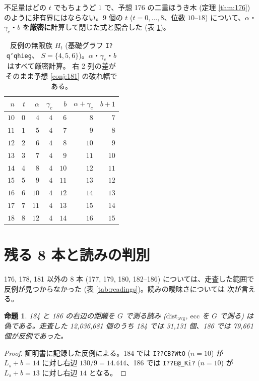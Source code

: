 \documentclass[paper=a4,fontsize=10.5pt,jafontsize=10.5pt]{jlreq}
\theoremstyle{plain}
\newtheorem{proposition}[theorem]{命題}
\theoremstyle{definition}
\begin{document}
不足量はどの $t$ でもちょうど $1$ で、予想 176 の二重ほうき木 (定理
\ref{thm:176}) のように非有界にはならない。$9$ 個の $t$ ($t = 0, \dots, 8$、位数 $10$--$18$) について、$\alpha$・$\gamma_c$・$b$ を\textbf{厳密に}計算して閉じた式と照合した (表 \ref{tab:fam181})。

\begin{table}[t]
\centering
\caption{反例の無限族 $H_t$ (基礎グラフ \texttt{I?q`qhieg}、
$S = \{4, 5, 6\}$)。$\alpha$・$\gamma_c$・$b$ はすべて厳密計算。
右 2 列の差がそのまま予想 \ref{conj:181} の破れ幅である。}
\label{tab:fam181}
\begin{tabular}{rrrrrrr}
\toprule
$n$ & $t$ & $\alpha$ & $\gamma_c$ & $b$ & $\alpha + \gamma_c$ & $b + 1$ \\
\midrule
$10$ & $0$ & $4$ & $4$ & $6$ & $8$ & $7$\\
$11$ & $1$ & $5$ & $4$ & $7$ & $9$ & $8$\\
$12$ & $2$ & $6$ & $4$ & $8$ & $10$ & $9$\\
$13$ & $3$ & $7$ & $4$ & $9$ & $11$ & $10$\\
$14$ & $4$ & $8$ & $4$ & $10$ & $12$ & $11$\\
$15$ & $5$ & $9$ & $4$ & $11$ & $13$ & $12$\\
$16$ & $6$ & $10$ & $4$ & $12$ & $14$ & $13$\\
$17$ & $7$ & $11$ & $4$ & $13$ & $15$ & $14$\\
$18$ & $8$ & $12$ & $4$ & $14$ & $16$ & $15$ \\
\bottomrule
\end{tabular}
\end{table}

\section{残る 8 本と読みの判別}\label{sec:readings}

176, 178, 181 以外の 8 本 (177, 179, 180, 182--186) については、走査した範囲で
反例が見つからなかった (表 \ref{tab:readings})。読みの曖昧さについては
次が言える。

\begin{proposition}\label{prop:false}
184 と 186 の右辺の距離を $G$ で測る読み ($\mathrm{dist}_{\mathrm{avg}}$,
$\mathrm{ecc}$ を $G$ で測る) は偽である。走査した 12,036,681 個のうち
184 では 31,131 個、186 では 79,661 個が反例であった。
\end{proposition}

\begin{proof}
証明書に記録した反例による。184 では \texttt{I??CB?WtO} ($n = 10$) が $L_s + b = 14$ に対し右辺 $130/9 = 14.444$、186 では \texttt{I??E@\_Ki?} ($n = 10$) が $L_s + b = 13$ に対し右辺 $14$ となる。
\end{proof}
\end{document}
